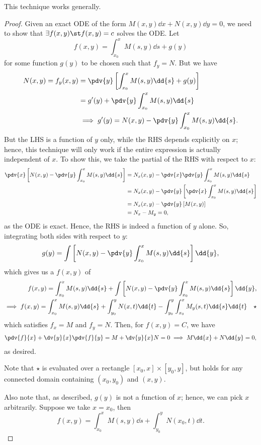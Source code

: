\begin{theorem}
    This technique works generally. %
\end{theorem}

\begin{proof}
    Given an exact ODE of the form $M(x,y) \dd{x} + N(x, y) \dd{y} = 0$, we need to show that $\exists f(x, y) \st f(x, y) = c$ solves the ODE. Let \[
    f(x, y) = \int_{x_0}^x M(s, y) \dd{s} + g(y) 
    \]
    for some function $g(y)$ to be chosen such that $f_y = N$. But we have \begin{align*}
    N(x, y) = f_y(x,y) &= \pdv{y} \left[\int_{x_0}^x M(s, y) \dd{s} + g(y)\right]\\
    &= g'(y) + \pdv{y} \int_{x_0}^x M(s, y) \dd{s}\\
    &\implies g'(y) = N(x, y) - \pdv{y} \int_{x_0}^x M(s, y) \dd{s}.
    \end{align*}
    But the LHS is a function of $y$ only, while the RHS depends explicitly on $x$; hence, this technique will only work if the entire expression is actually independent of $x$. To show this, we take the partial of the RHS with respect to $x$:
    \begin{align*}
        \pdv{x}\left[N(x, y) - \pdv{y} \int_{x_0}^x M(s, y) \dd{s}\right] &= N_x(x, y) - \pdv{x}\pdv{y} \int_{x_0}^x M(s, y) \dd{s}\\
        &=N_x(x, y) - \pdv{y}\left[\pdv{x} \int_{x_0}^x M(s, y) \dd{s} \right]\\
        &= N_x(x, y) - \pdv{y} \left[M(x, y)\right]\\
        &= N_x - M_y = 0,
    \end{align*}
    as the ODE is exact. Hence, the RHS is indeed a function of $y$ alone. So, integrating both sides with respect to $y$: \begin{align*}
       g(y) = \int \left[N(x,y) - \pdv{y} \int_{x_0}^x M(s, y) \dd{s}\right] \dd{y},
    \end{align*}
    which gives us a $f(x, y)$ of \begin{align*}
        f(x, y) = \int_{x_0}^{x} M(s, y) \dd{s} + \int \left[N(x,y) - \pdv{y} \int_{x_0}^x M(s, y) \dd{s}\right] \dd{y},\\
        \implies f(x, y) = \int_{x_0}^x M(s, y) \dd{s} + \int_{y_0}^y N(x, t) \dd{t} - \int_{y_0}^y \int_{x_0}^x M_y(s, t) \dd{s} \dd{t} \quad \star
    \end{align*}
    which satisfies $f_x = M$ and $f_y = N$. Then, for $f(x,y) = C$, we have \begin{align*}
        \pdv{f}{x} + \dv{y}{x}\pdv{f}{y} = M + \dv{y}{x} N = 0 \implies M \dd{x} + N \dd{y} = 0,
    \end{align*}
    as desired.

    Note that $\star$ is evaluated over a rectangle $[x_0, x] \times [y_0, y]$, but holds for any connected domain containing $(x_0, y_0)$ and $(x, y)$. 

    Also note that, as described, $g(y)$ is not a function of $x$; hence, we can pick $x$ arbitrarily. Suppose we take $x = x_0$, then \[
    f(x, y) = \int_{x_0}^x M(s, y) \dd{s} + \int_{y_0}^y N(x_0, t) \dd{t}.
    \]
\end{proof}

